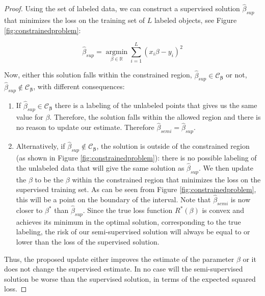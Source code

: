 \documentclass{llncs}
\newcommand{\Nlab}{L}
\begin{document}
\begin{proof}
Using the set of labeled data, we can construct a supervised solution $\hat{\beta}_{sup}$ that minimizes the loss on the training set of $\Nlab$ labeled objects, see Figure \ref{fig:constrainedproblem}:

\begin{equation} \label{supervisedsolution}
\hat{\beta}_{sup} = \operatorname*{argmin}_{\beta \in \mathbb{R}} \sum_{i=1}^{\Nlab} (x_i \beta - y_i)^2
\end{equation}

Now, either this solution falls within the constrained region, $\hat{\beta}_{sup} \in \mathcal{C}_{\boldsymbol{\beta}}$ or not, $\hat{\beta}_{sup} \notin \mathcal{C}_{\boldsymbol{\beta}}$, with different consequences:

\begin{enumerate}
  \item If $\hat{\beta}_{sup} \in \mathcal{C}_{\boldsymbol{\beta}}$ there is a labeling of the unlabeled points that gives us the same value for $\beta$. Therefore, the solution falls within the allowed region and there is no reason to update our estimate. Therefore $\hat{\beta}_{semi}=\hat{\beta}_{sup}$.
  \item Alternatively, if $\hat{\beta}_{sup} \notin  \mathcal{C}_{\boldsymbol{\beta}}$, the solution is outside of the constrained region (as shown in Figure \ref{fig:constrainedproblem}): there is no possible labeling of the unlabeled data that will give the same solution as $\hat{\beta}_{sup}$. We then update the $\beta$ to be the $\beta$ within the constrained region that minimizes the loss on the supervised training set. As can be seen from Figure \ref{fig:constrainedproblem}, this will be a point on the boundary of the interval. Note that $\hat{\beta}_{semi}$ is now closer to $\beta^{*}$ than $\hat{\beta}_{sup}$. Since the true loss function $R^*(\beta)$ is convex  and achieves its minimum in the optimal solution, corresponding to the true labeling, the risk of our semi-supervised solution will always be equal to or lower than the loss of the supervised solution.
\end{enumerate}

Thus, the proposed update either improves the estimate of the parameter $\beta$ or it does not change the supervised estimate. In no case will the semi-supervised solution be worse than the supervised solution, in terms of the expected squared loss.


\end{proof}
\end{document}
